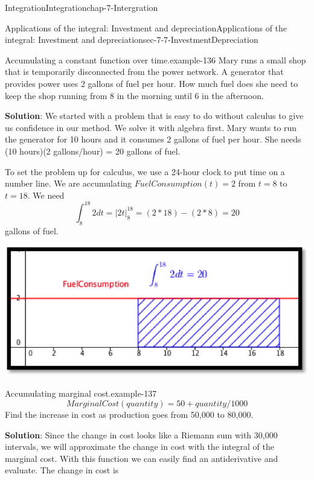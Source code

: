 \documentclass[oneside,10pt,]{book}
\newcommand{\terminology}[1]{\textbf{#1}}
\numberwithin{equation}{section}
\begin{document}
\begin{chapterptx}{Integration}{}{Integration}{}{}{chap-7-Intergration}
\begin{sectionptx}{Applications of the integral: Investment and depreciation}{}{Applications of the integral: Investment and depreciation}{}{}{sec-7-7-InvestmentDepreciation}
\begin{example}{Accumulating a constant function over time.}{example-136}%
\hypertarget{p-3006}{}%
Mary runs a small shop that is temporarily disconnected from the power network.  A generator that provides power uses 2 gallons of fuel per hour.  How much fuel does she need to keep the shop running from 8 in the morning until 6 in the afternoon.%
\par
\hypertarget{p-3007}{}%
\terminology{Solution}: We started with a problem that is easy to do without calculus to give us confidence in our method.  We solve it with algebra first.  Mary wants to run the generator for 10 hours and it consumes 2 gallons of fuel per hour.  She needs (10 hours)(2 gallons\slash{}hour) = 20 gallons of fuel.%
\par
\hypertarget{p-3008}{}%
To set the problem up for calculus, we use a 24-hour clock to put time on a number line.  We are accumulating \(FuelConsumption(t)=2\) from \(t=8\) to \(t=18\).  We need%
%
\begin{equation*}
\int_8^{18} 2 dt=|2t|_8^{18}=(2*18)-(2*8)=20
\end{equation*}
\hypertarget{p-3009}{}%
gallons of fuel.%
\begin{sidebyside}{1}{0.15}{0.15}{0}%
\begin{sbspanel}{0.7}%
\includegraphics[width=1\linewidth]{images/sec7-7-1.png}
\end{sbspanel}%
\end{sidebyside}%
\end{example}
\begin{example}{Accumulating marginal cost.}{example-137}%
%
\begin{equation*}
Marginal Cost(quantity)=50+quantity/1000
\end{equation*}
\hypertarget{p-3010}{}%
Find the increase in cost as production goes from 50,000 to 80,000.%
\par
\hypertarget{p-3011}{}%
\terminology{Solution}: Since the change in cost looks like a Riemann sum with 30,000 intervals, we will approximate the change in cost with the integral of the marginal cost.  With this function we can easily find an antiderivative and evaluate. The change in cost is%

\end{example}
\end{sectionptx}
\end{chapterptx}
\end{document}
